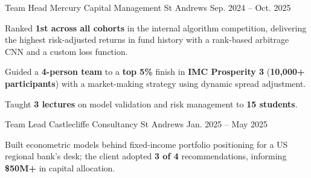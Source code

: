 \begin{cventries}
  \cventry
    {Team Head} %
    {Mercury Capital Management} %
    {St Andrews} %
    {Sep. 2024 -- Oct. 2025} %
    {
      \begin{cvitems}
        \item {Ranked \textbf{1st across all cohorts} in the internal algorithm competition, delivering the highest risk-adjusted returns in fund history with a rank-based arbitrage CNN and a custom loss function.}
        \item {Guided a \textbf{4-person team} to a \textbf{top 5\%} finish in \textbf{IMC Prosperity 3} (\textbf{10,000+ participants}) with a market-making strategy using dynamic spread adjustment.}
        \item {Taught \textbf{3 lectures} on model validation and risk management to \textbf{15 students}.}
      \end{cvitems}
    }

  \cventry
    {Team Lead} %
    {Castlecliffe Consultancy} %
    {St Andrews} %
    {Jan. 2025 -- May 2025} %
    {
      \begin{cvitems}
        \item {Built econometric models behind fixed-income portfolio positioning for a US regional bank's desk; the client adopted \textbf{3 of 4} recommendations, informing \textbf{\$50M+} in capital allocation.}
      \end{cvitems}
    }

\end{cventries}
